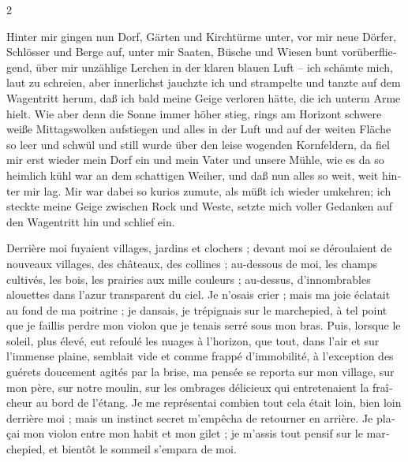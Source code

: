 \documentclass[a4paper,11pt]{article}
\newcommand\chunks[2]{%
\begin{leftcolumn*}\begin{otherlanguage}{german}%
{#1}%
\end{otherlanguage}\end{leftcolumn*}%
\begin{rightcolumn}\begin{otherlanguage}{french}%
{#2}%
\end{otherlanguage}\end{rightcolumn}%
}
\begin{document}
\begin{paracol}{2}
  \chunks{Hinter mir gingen nun Dorf, Gärten und Kirchtürme unter, vor mir neue Dörfer, Schlösser und Berge auf, unter mir Saaten, Büsche und Wiesen bunt vorüberfliegend, über mir unzählige Lerchen in der klaren blauen Luft – ich schämte mich, laut zu schreien, aber innerlichst jauchzte ich und strampelte und tanzte auf dem Wagentritt herum, daß ich bald meine Geige verloren hätte, die ich unterm Arme hielt. Wie aber denn die Sonne immer höher stieg, rings am Horizont schwere weiße Mittagswolken aufstiegen und alles in der Luft und auf der weiten Fläche so leer und schwül und still wurde über den leise wogenden Kornfeldern, da fiel mir erst wieder mein Dorf ein und mein Vater und unsere Mühle, wie es da so heimlich kühl war an dem schattigen Weiher, und daß nun alles so weit, weit hinter mir lag. Mir war dabei so kurios zumute, als müßt ich wieder umkehren; ich steckte meine Geige zwischen Rock und Weste, setzte mich voller Gedanken auf den Wagentritt hin und schlief ein.}
         {Derrière moi fuyaient villages, jardins et clochers ; devant moi se déroulaient de nouveaux villages, des châteaux, des collines ; au-dessous de moi, les champs cultivés, les bois, les prairies aux mille couleurs ; au-dessus, d’innombrables alouettes dans l’azur transparent du ciel. Je n’osais crier ; mais ma joie éclatait au fond de ma poitrine ; je dansais, je trépignais sur le marchepied, à tel point que je faillis perdre mon violon que je tenais serré sous mon bras. Puis, lorsque le soleil, plus élevé, eut refoulé les nuages à l’horizon, que tout, dans l’air et sur l’immense plaine, semblait vide et comme frappé d’immobilité, à l’exception des guérets doucement agités par la brise, ma pensée se reporta sur mon village, sur mon père, sur notre moulin, sur les ombrages délicieux qui entretenaient la fraîcheur au bord de l’étang. Je me représentai combien tout cela était loin, bien loin derrière moi ; mais un instinct secret m’empêcha de retourner en arrière. Je plaçai mon violon entre mon habit et mon gilet ; je m’assis tout pensif sur le marchepied, et bientôt le sommeil s’empara de moi.}

\end{paracol}
\end{document}
